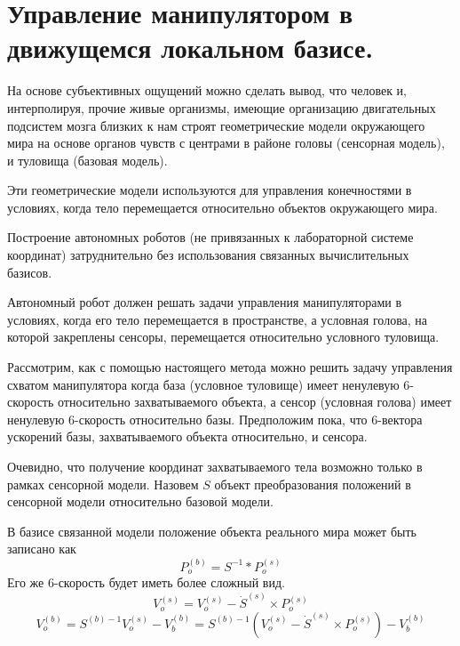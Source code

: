 \section{Управление манипулятором в движущемся локальном базисе.}

На основе субъективных ощущений можно сделать вывод, что человек и, интерполируя, прочие живые организмы, имеющие организацию двигательных подсистем мозга близких к нам строят геометрические модели окружающего мира на основе органов чувств с центрами в районе головы (сенсорная модель), и туловища (базовая модель).

Эти геометрические модели используются для управления конечностями в условиях, когда тело перемещается относительно объектов окружающего мира.

Построение автономных роботов (не привязанных к лабораторной системе координат) затруднительно без использования связанных вычислительных базисов.

Автономный робот должен решать задачи управления манипуляторами в условиях, когда его тело перемещается в пространстве, а условная голова, на которой закреплены сенсоры, перемещается относительно условного туловища. 

Рассмотрим, как с помощью настоящего метода можно решить задачу управления схватом манипулятора когда база (условное туловище) имеет ненулевую 6-скорость относительно захватываемого объекта, а сенсор (условная голова) имеет ненулевую 6-скорость относительно базы. Предположим пока, что 6-вектора ускорений базы, захватываемого объекта относительно, и сенсора. 

Очевидно, что получение координат захватываемого тела возможно только в рамках сенсорной модели. Назовем $S$ объект преобразования положений в сенсорной модели относительно базовой модели.

В базисе связанной модели положение объекта реального мира может быть записано как
\begin{equation}
P_o^{(b)} = S^{-1} * P_o^{(s)}
\end{equation}
Его же 6-скорость будет иметь более сложный вид.
\begin{equation}\label{bura}
V_o^{(s)} = V_o^{(s)} - \dot{S}^{(s)} \times P_o^{(s)}
\end{equation}
\begin{equation}
V_o^{(b)} = S^{(b)-1} V_o^{(s)} - V_b^{(b)} = S^{(b)-1} (V_o^{(s)} - \dot{S}^{(s)} \times P_o^{(s)}) - V_b^{(b)}
\end{equation}

